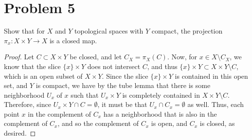 \documentclass[fontsize=11pt]{scrartcl} %
\numberwithin{equation}{section} %
\numberwithin{figure}{section} %
\numberwithin{table}{section} %
\begin{document}
\section*{Problem 5}
Show that for $X$ and $Y$ topological spaces with $Y$ compact, the projection
$\pi_x:X\times Y\to X$ is a closed map.
\\
\begin{proof}
    Let $C\subset X\times Y$ be closed, and let $C_X = \pi_X(C)$. Now, for $x\in
    X\setminus C_X$, we know that the slice $\{x\}\times Y$ does not intersect
    $C$, and thus $\{x\}\times Y\subset X\times Y\setminus C$, which is an open
    subset of $X\times Y$. Since the slice $\{x\}\times Y$ is contained in this
    open set, and $Y$ is compact, we have by the tube lemma that there is some
    neighborhood $U_x$ of $x$ such that $U_x\times Y$ is completely contained in
    $X\times Y\setminus C$. Therefore, since $U_x\times Y\cap C = \emptyset$, it
    must be that $U_x\cap C_x = \emptyset$ as well. Thus, each point $x$ in the
    complement of $C_x$ has a neighborhood that is also in the complement of
    $C_x$, and so the complement of $C_x$ is open, and $C_x$ is closed, as
    desired.
\end{proof}

\newpage
\end{document}
